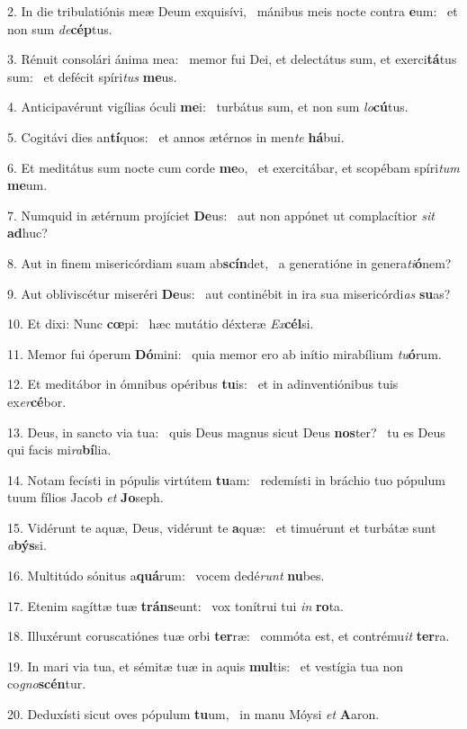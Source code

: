 2. In die tribulatiónis meæ Deum exquisívi, \dag\  mánibus meis nocte contra \textbf{e}um: \ast\  et non sum \textit{de}\textbf{cép}tus.\

3. Rénuit consolári ánima mea: \dag\  memor fui Dei, et delectátus sum, et exerci\textbf{tá}tus sum: \ast\  et defécit spíri\textit{tus} \textbf{me}us.\

4. Anticipavérunt vigílias óculi \textbf{me}i: \ast\  turbátus sum, et non sum \textit{lo}\textbf{cú}tus.\

5. Cogitávi dies an\textbf{tí}quos: \ast\  et annos ætérnos in men\textit{te} \textbf{há}bui.\

6. Et meditátus sum nocte cum corde \textbf{me}o, \ast\  et exercitábar, et scopébam spíri\textit{tum} \textbf{me}um.\

7. Numquid in ætérnum projíciet \textbf{De}us: \ast\  aut non appónet ut complacítior \textit{sit} \textbf{ad}huc?\

8. Aut in finem misericórdiam suam ab\textbf{scín}det, \ast\  a generatióne in genera\textit{ti}\textbf{ó}nem?\

9. Aut obliviscétur miseréri \textbf{De}us: \ast\  aut continébit in ira sua misericórdi\textit{as} \textbf{su}as?\

10. Et dixi: Nunc \textbf{cœ}pi: \ast\  hæc mutátio déxteræ \textit{Ex}\textbf{cél}si.\

11. Memor fui óperum \textbf{Dó}mini: \ast\  quia memor ero ab inítio mirabílium \textit{tu}\textbf{ó}rum.\

12. Et meditábor in ómnibus opéribus \textbf{tu}is: \ast\  et in adinventiónibus tuis ex\textit{er}\textbf{cé}bor.\

13. Deus, in sancto via tua: \dag\  quis Deus magnus sicut Deus \textbf{nos}ter? \ast\  tu es Deus qui facis mi\textit{ra}\textbf{bí}lia.\

14. Notam fecísti in pópulis virtútem \textbf{tu}am: \ast\  redemísti in bráchio tuo pópulum tuum fílios Jacob \textit{et} \textbf{Jo}seph.\

15. Vidérunt te aquæ, Deus, vidérunt te \textbf{a}quæ: \ast\  et timuérunt et turbátæ sunt \textit{a}\textbf{býs}si.\

16. Multitúdo sónitus a\textbf{quá}rum: \ast\  vocem dedé\textit{runt} \textbf{nu}bes.\

17. Etenim sagíttæ tuæ \textbf{tráns}eunt: \ast\  vox tonítrui tui \textit{in} \textbf{ro}ta.\

18. Illuxérunt coruscatiónes tuæ orbi \textbf{ter}ræ: \ast\  commóta est, et contrému\textit{it} \textbf{ter}ra.\

19. In mari via tua, et sémitæ tuæ in aquis \textbf{mul}tis: \ast\  et vestígia tua non co\textit{gno}\textbf{scén}tur.\

20. Deduxísti sicut oves pópulum \textbf{tu}um, \ast\  in manu Móysi \textit{et} \textbf{A}aron.\

